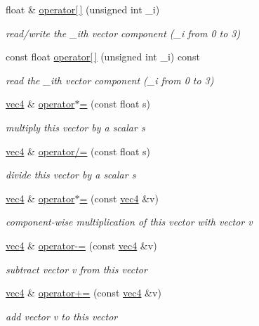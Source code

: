 \begin{DoxyCompactItemize}
\item 
float \& \hyperlink{classvec4_aec6937954e939236b02eda65b00abf5d}{operator\mbox{[}$\,$\mbox{]}} (unsigned int \+\_\+i)
\begin{DoxyCompactList}\small\item\em read/write the \+\_\+i\textquotesingle{}th vector component (\+\_\+i from 0 to 3) \end{DoxyCompactList}\item 
const float \hyperlink{classvec4_ad26676799641dfe9033d3715423ade8d}{operator\mbox{[}$\,$\mbox{]}} (unsigned int \+\_\+i) const 
\begin{DoxyCompactList}\small\item\em read the \+\_\+i\textquotesingle{}th vector component (\+\_\+i from 0 to 3) \end{DoxyCompactList}\item 
\hyperlink{classvec4}{vec4} \& \hyperlink{classvec4_ac97789260e6386514fe8586d2e7db372}{operator$\ast$=} (const float s)
\begin{DoxyCompactList}\small\item\em multiply this vector by a scalar {\ttfamily s} \end{DoxyCompactList}\item 
\hyperlink{classvec4}{vec4} \& \hyperlink{classvec4_aaebb986a13f6d696f7c7554e564ce85a}{operator/=} (const float s)
\begin{DoxyCompactList}\small\item\em divide this vector by a scalar {\ttfamily s} \end{DoxyCompactList}\item 
\hyperlink{classvec4}{vec4} \& \hyperlink{classvec4_a0c2976559fb5c6c0c3864071c0a3bdad}{operator$\ast$=} (const \hyperlink{classvec4}{vec4} \&v)
\begin{DoxyCompactList}\small\item\em component-\/wise multiplication of this vector with vector {\ttfamily v} \end{DoxyCompactList}\item 
\hyperlink{classvec4}{vec4} \& \hyperlink{classvec4_a7b7f91f9ae6a8dce5404be6eb7ee4c41}{operator-\/=} (const \hyperlink{classvec4}{vec4} \&v)
\begin{DoxyCompactList}\small\item\em subtract vector {\ttfamily v} from this vector \end{DoxyCompactList}\item 
\hyperlink{classvec4}{vec4} \& \hyperlink{classvec4_a32b3157d2fd121ac428b3e25bdd03d5f}{operator+=} (const \hyperlink{classvec4}{vec4} \&v)
\begin{DoxyCompactList}\small\item\em add vector {\ttfamily v} to this vector \end{DoxyCompactList}\end{DoxyCompactItemize}
